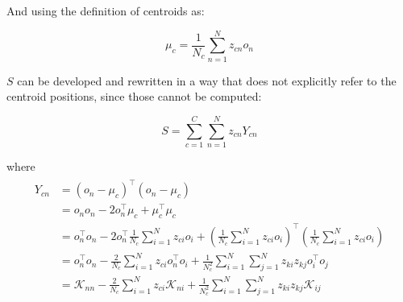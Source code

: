 \documentclass[natbib,smallextended]{svjour3}
\providecommand{\DIFaddbegin}{} %
\providecommand{\DIFaddend}{} %
\providecommand{\DIFdelbegin}{} %
\providecommand{\DIFdelend}{} %
\newcommand{\DIFscaledelfig}{0.5}
\newlength{\DIFdelgraphicswidth} %
\newlength{\DIFdelgraphicsheight} %
\newcommand{\DIFaddincludegraphics}[2][]{{\color{blue}\fbox{\DIFOincludegraphics[#1]{#2}}}} %
\newcommand{\DIFdelincludegraphics}[2][]{%
\sbox{\DIFdelgraphicsbox}{\DIFOincludegraphics[#1]{#2}}%
\settoboxwidth{\DIFdelgraphicswidth}{\DIFdelgraphicsbox} %
\settoboxtotalheight{\DIFdelgraphicsheight}{\DIFdelgraphicsbox} %
\scalebox{\DIFscaledelfig}{%
\parbox[b]{\DIFdelgraphicswidth}{\usebox{\DIFdelgraphicsbox}\\[-\baselineskip] \rule{\DIFdelgraphicswidth}{0em}}\llap{\resizebox{\DIFdelgraphicswidth}{\DIFdelgraphicsheight}{%
\setlength{\unitlength}{\DIFdelgraphicswidth}%
\begin{picture}(1,1)%
\thicklines\linethickness{2pt} %
{\color[rgb]{1,0,0}\put(0,0){\framebox(1,1){}}}%
{\color[rgb]{1,0,0}\put(0,0){\line( 1,1){1}}}%
{\color[rgb]{1,0,0}\put(0,1){\line(1,-1){1}}}%
\end{picture}%
}\hspace*{3pt}}} %
} %
\DeclareRobustCommand{\DIFaddbegin}{\DIFOaddbegin \let\includegraphics\DIFaddincludegraphics} %
\DeclareRobustCommand{\DIFaddend}{\DIFOaddend \let\includegraphics\DIFOincludegraphics} %
\DeclareRobustCommand{\DIFdelbegin}{\DIFOdelbegin \let\includegraphics\DIFdelincludegraphics} %
\DeclareRobustCommand{\DIFdelend}{\DIFOaddend \let\includegraphics\DIFOincludegraphics} %
\begin{document}
And using the definition of centroids as:

\[
\mu_c = \frac{1}{N_c}\sum_{n=1}^{N}z_{cn}o_n
\]

$S$ can be developed and rewritten in a way that does not explicitly refer to the centroid positions, since those cannot be computed:

\[
S = \sum_{c=1}^{C} \sum_{n=1}^{N} z_{cn} Y_{cn}
\]

where
\begin{align}
\DIFdelbegin %
\DIFdelend \DIFaddbegin \begin{split}
Y_{cn} & =  \left(o_n-\mu_c\right)^\top\left(o_n-\mu_c\right) \\
       & =  o_no_n - 2 o_n^\top \mu_c + \mu_c^\top \mu_c \\
       & =  o_n^\top o_n - 2 o_n^\top \frac{1}{N_c} \sum_{i=1}^{N} z_{ci} o_i +
       	 \left(\frac{1}{N_c} \sum_{i=1}^{N} z_{ci} o_i\right)^\top
         \left(\frac{1}{N_c} \sum_{i=1}^{N} z_{ci} o_i\right)\\
       & =  o_n^\top o_n - \frac{2}{N_c} \sum_{i=1}^{N} z_{ci} o_n^\top o_i +
       	 \frac{1}{N_c^2} \sum_{i=1}^{N} \sum_{j=1}^{N} z_{ki} z_{kj} o_i^\top o_j \\
       & =  \mathcal{K}_{nn} - \frac{2}{N_c} \sum_{i=1}^{N} z_{ci} \mathcal{K}_{ni} +
         \frac{1}{N_c^2} \sum_{i=1}^{N} \sum_{j=1}^{N} z_{ki} z_{kj} \mathcal{K}_{ij} \label{eq:yki}
\end{split}
\DIFaddend \end{align}
\end{document}
